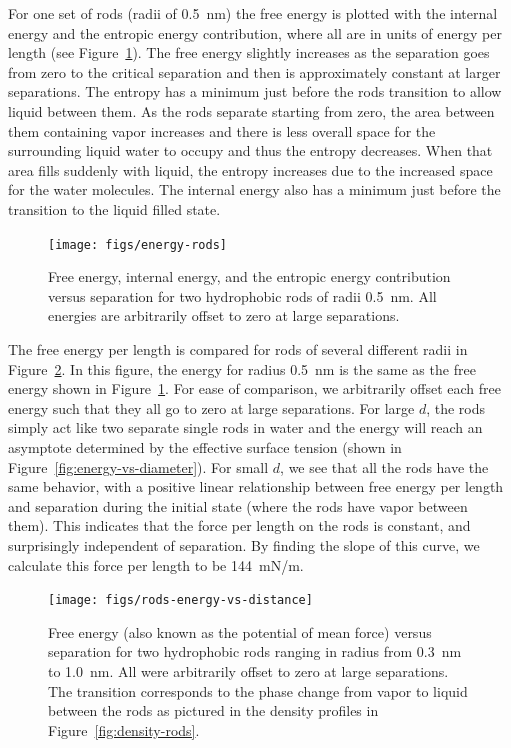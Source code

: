 \documentclass[letterpaper,twocolumn,amsmath,amssymb,prb]{revtex4-1}
\begin{document}
For one set of rods (radii of 0.5~nm) the free energy is plotted with the internal energy
and the entropic energy contribution, where all are in units of energy per length 
(see Figure~\ref{fig:energy-rods}). The free energy slightly increases as the separation
goes from zero to the critical separation and then is approximately constant at
larger separations. The entropy has a minimum just before the rods
transition to allow liquid between them. As the rods separate starting from zero, the area 
between them containing vapor increases and there is less overall space for the 
surrounding liquid water to occupy and thus the entropy decreases. When that area fills suddenly
with liquid, the entropy increases due to the increased space for the water molecules. The
internal energy also has a minimum just before the transition to the liquid filled state.

\begin{figure}
\begin{center}
\texttt{[image: figs/energy-rods]}
\end{center}
\caption{ Free energy, internal energy, and the entropic energy contribution versus
separation for two hydrophobic rods of radii 0.5~nm. All energies are arbitrarily
offset to zero at large separations. }
\label{fig:energy-rods}
\end{figure}

The free energy per length is compared for rods of several different radii
in Figure~\ref{fig:rods-energy-vs-distance}. In this figure, the energy for radius 0.5~nm
is the same as the free energy shown in Figure~\ref{fig:energy-rods}.
For ease of comparison, we arbitrarily offset each free energy such that they all go 
to zero at large separations. For large $d$, the rods 
simply act like two separate single rods in water and the energy will
reach an asymptote determined by the effective surface tension (shown in 
Figure~\ref{fig:energy-vs-diameter}). For small $d$, we see that all the rods 
have the same behavior, with a positive linear relationship
between free energy per length and separation during the initial state 
(where the rods have vapor between them). This indicates that the force 
per length on the rods is constant, and surprisingly independent of separation. 
By finding the slope of this curve, we calculate this force per length to be 144~mN/m.

\begin{figure}
\begin{center}
\texttt{[image: figs/rods-energy-vs-distance]}
\end{center}
\caption{ Free energy (also known as the potential of mean force) 
versus separation for two hydrophobic rods ranging in radius from
0.3~nm to 1.0~nm.
All were arbitrarily offset to zero at large separations. The
transition corresponds to the phase change from
vapor to liquid between the rods as pictured in the density profiles in 
Figure~\ref{fig:density-rods}. }
\label{fig:rods-energy-vs-distance}
\end{figure}
\end{document}

